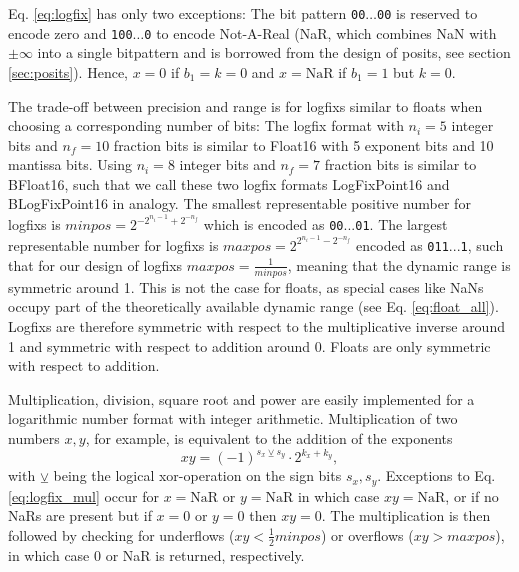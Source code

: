 Eq. \ref{eq:logfix} has only two exceptions: The bit pattern \texttt{00$\dots$00} is reserved to encode zero and \texttt{100$\dots$0}
to encode Not-A-Real (NaR, which combines NaN with $\pm \infty$ into a single bitpattern and is borrowed from the design of
posits, see section \ref{sec:posits}). Hence, $x=0$ if $b_1 = k = 0$ and $x = \text{NaR}$ if $b_1 = 1$ but $k=0$.

The trade-off between precision and range is for logfixs similar to floats when choosing a corresponding number of bits:
The logfix format with $n_i=5$ integer bits and $n_f=10$ fraction bits is similar to Float16 with 5
exponent bits and 10 mantissa bits. Using $n_i=8$ integer bits and $n_f=7$ fraction bits is similar to BFloat16, such that
we call these two logfix formats LogFixPoint16 and BLogFixPoint16 in analogy. The smallest representable positive number
for logfixs is $minpos = 2^{-2^{n_i-1} + 2^{-n_f}}$ which is encoded as \texttt{00$...$01}. The largest representable number
for logfixs is $maxpos = 2^{2^{n_i-1} - 2^{-n_f}}$ encoded as \texttt{011$...$1}, such that for our design of logfixs
$maxpos = \tfrac{1}{minpos}$, meaning that the dynamic range is symmetric around 1. This is not the case for floats,
as special cases like NaNs occupy part of the theoretically available dynamic range (see Eq. \ref{eq:float_all}).
Logfixs are therefore symmetric with respect to the multiplicative inverse around 1 and symmetric with respect to addition
around 0. Floats are only symmetric with respect to addition.

Multiplication, division, square root and power are easily implemented for a logarithmic number format with integer arithmetic. 
Multiplication of two numbers $x,y$, for example, is equivalent to the addition of the exponents
\begin{equation}
xy = (-1)^{s_x \veebar s_y} \cdot 2^{k_x + k_y},
\label{eq:logfix_mul}
\end{equation}
with $\veebar$ being the logical xor-operation on the sign bits $s_x,s_y$. Exceptions to Eq. \ref{eq:logfix_mul} occur for $x = \text{NaR}$
or $y = \text{NaR}$ in which case $xy = \text{NaR}$, or if no NaRs are present but if $x=0$ or $y=0$ then $xy= 0$. The multiplication 
is then followed by checking for underflows ($xy < \tfrac{1}{2}minpos$) or overflows ($xy > maxpos$), in which case 0 or NaR is returned,
respectively. 

